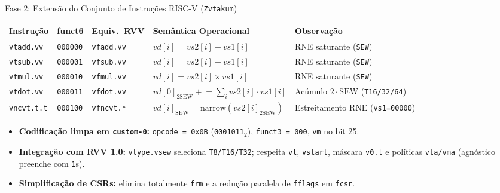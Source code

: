 \documentclass[aspectratio=169,10pt]{beamer}
\begin{document}
\begin{frame}{Fase 2: Extensão do Conjunto de Instruções RISC-V (\texttt{Zvtakum})}
	\small
	\begin{table}
		\centering
		\footnotesize
		\begin{tabular}{@{}lllll@{}}
			\toprule
			\textbf{Instrução} & \textbf{funct6} & \textbf{Equiv.\ RVV} & \textbf{Semântica Operacional} & \textbf{Observação} \\
			\midrule
			\texttt{vtadd.vv} & \texttt{000000} & \texttt{vfadd.vv} & $vd[i] = vs2[i] + vs1[i]$ & RNE saturante (\texttt{SEW}) \\
			\texttt{vtsub.vv} & \texttt{000001} & \texttt{vfsub.vv} & $vd[i] = vs2[i] - vs1[i]$ & RNE saturante (\texttt{SEW}) \\
			\texttt{vtmul.vv} & \texttt{000010} & \texttt{vfmul.vv} & $vd[i] = vs2[i] \times vs1[i]$ & RNE saturante (\texttt{SEW}) \\
			\texttt{vtdot.vv} & \texttt{000011} & \texttt{vfdot.vv} & $vd[0]_{2\mathrm{SEW}} \mathrel{+}= \sum_i vs2[i] \cdot vs1[i]$ & Acúmulo $2\cdot\mathrm{SEW}$ (\texttt{T16/32/64}) \\
			\texttt{vncvt.t.t} & \texttt{000100} & \texttt{vfncvt.*} & $vd[i]_{\mathrm{SEW}} = \mathrm{narrow}(vs2[i]_{2\mathrm{SEW}})$ & Estreitamento RNE (\texttt{vs1=00000}) \\
			\bottomrule
		\end{tabular}
	\end{table}
	\begin{itemize}
		\item \textbf{Codificação limpa em \texttt{custom-0}:} \texttt{opcode = 0x0B} (\texttt{0001011}$_2$), \texttt{funct3 = 000}, \texttt{vm} no bit 25.
		\item \textbf{Integração com RVV 1.0:} \texttt{vtype.vsew} seleciona \texttt{T8/T16/T32}; respeita \texttt{vl}, \texttt{vstart}, máscara \texttt{v0.t} e políticas \texttt{vta/vma} (agnóstico preenche com \texttt{1}s).
		\item \textbf{Simplificação de CSRs:} elimina totalmente \texttt{frm} e a redução paralela de \texttt{fflags} em \texttt{fcsr}.
	\end{itemize}
\end{frame}
\end{document}
